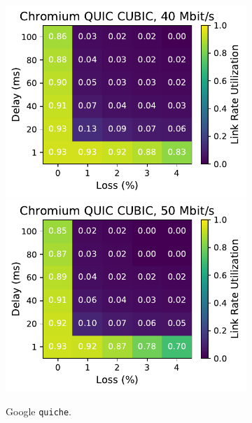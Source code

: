 \begin{figure}[ht]
\begin{subfigure}[b]{0.22\linewidth}
        \includegraphics[width=\linewidth,trim={0 0 2cm 0},clip]{splitting-paper/figures/heatmaps/heatmap_quic_cubic_40mbps.pdf}
        \includegraphics[width=\linewidth,trim={0 0 2cm 0},clip]{splitting-paper/figures/heatmaps/heatmap_quic_cubic_50mbps.pdf}
        \caption{Google \texttt{quiche}.}
    \end{subfigure}
    \begin{subfigure}[b]{0.22\linewidth}

\end{subfigure}
\end{figure}
